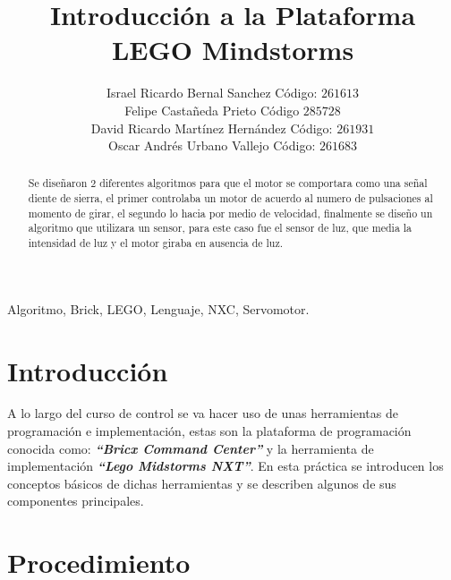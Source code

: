 \documentclass[twocolumn]{IEEEtran}
\begin{document}
\title{Introducción a la Plataforma LEGO Mindstorms}
\author{Israel Ricardo Bernal Sanchez Código: $261613$\\
	Felipe Castañeda Prieto Código $285728$\\
	David Ricardo Martínez Hernández Código: $261931$\\
	Oscar Andrés Urbano Vallejo Código: $261683$}
\maketitle
{}
\begin{abstract}
 Se diseñaron $2$ diferentes algoritmos para que el motor se comportara como una señal diente de sierra, el primer controlaba un motor de acuerdo al numero de pulsaciones al momento de girar, el segundo lo hacia por medio de velocidad, finalmente se diseño un algoritmo que utilizara un sensor, para este caso fue el sensor de luz, que media la intensidad de luz y el motor giraba en ausencia de luz.
\end{abstract}

\begin{keywords}
 Algoritmo, Brick, LEGO, Lenguaje, NXC, Servomotor.
\end{keywords}

\section{Introducción}
\noindent
A lo largo del curso de control se va hacer uso de unas herramientas de programación e implementación, estas son la plataforma de programación conocida como: \textbf{\textit{``Bricx Command Center''}} y  la herramienta de implementación \textbf{\textit{``Lego Midstorms NXT''}}. En esta práctica se introducen los conceptos básicos de dichas herramientas y se describen algunos de sus componentes principales. 

\section{Procedimiento}
\end{document}
